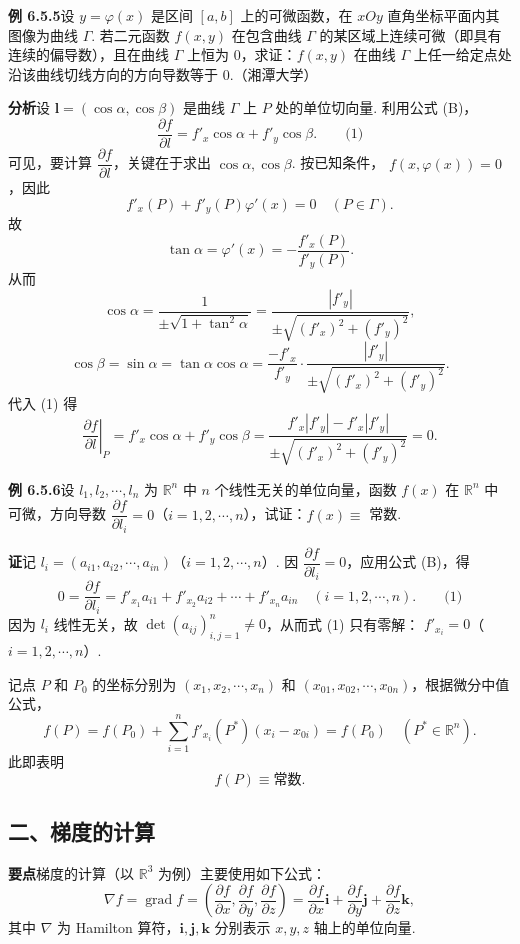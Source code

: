 \documentclass[UTF8, 12pt, fontset=fandol, oneside]{ctexart}
\begin{document}
\noindent\textbf{例 6.5.5}\quad 设 $y=\varphi(x)$ 是区间 $[a,b]$ 上的可微函数，在 $xOy$ 直角坐标平面内其图像为曲线 $\Gamma$. 若二元函数 $f(x,y)$ 在包含曲线 $\Gamma$ 的某区域上连续可微（即具有连续的偏导数），且在曲线 $\Gamma$ 上恒为 $0$，求证：$f(x,y)$ 在曲线 $\Gamma$ 上任一给定点处沿该曲线切线方向的方向导数等于 $0$.（湘潭大学）

\noindent\textbf{分析}\quad 设 $\mathbf l=(\cos\alpha,\cos\beta)$ 是曲线 $\Gamma$ 上 $P$ 处的单位切向量. 利用公式 (B)，
\[
  \frac{\partial f}{\partial l}=f'_x\cos\alpha+f'_y\cos\beta. \qquad\text{(1)}
\]
可见，要计算 $\dfrac{\partial f}{\partial l}$，关键在于求出 $\cos\alpha,\cos\beta$. 按已知条件，
$f(x,\varphi(x))=0$，因此
\[
  f'_x(P)+f'_y(P)\varphi'(x)=0\quad(P\in\Gamma).
\]
故
\[
  \tan\alpha=\varphi'(x)=-\frac{f'_x(P)}{f'_y(P)}.
\]
从而
\[
  \cos\alpha=\frac1{\pm\sqrt{1+\tan^2\alpha}}
  =
  \frac{|f'_y|}{\pm\sqrt{(f'_x)^2+(f'_y)^2}},
\]
\[
  \cos\beta=\sin\alpha=\tan\alpha\cos\alpha
  =
  \frac{-f'_x}{f'_y}\cdot
  \frac{|f'_y|}{\pm\sqrt{(f'_x)^2+(f'_y)^2}}.
\]
代入 (1) 得
\[
\left.\frac{\partial f}{\partial l}\right|_P
=f'_x\cos\alpha+f'_y\cos\beta
=
\frac{f'_x|f'_y|-f'_x|f'_y|}
{\pm\sqrt{(f'_x)^2+(f'_y)^2}}
=0.
\]

\noindent\textbf{例 6.5.6}\quad 设 $l_1,l_2,\cdots,l_n$ 为 $\mathbb R^n$ 中 $n$ 个线性无关的单位向量，函数 $f(x)$ 在 $\mathbb R^n$ 中可微，方向导数
$\dfrac{\partial f}{\partial l_i}=0$（$i=1,2,\cdots,n$），试证：$f(x)\equiv$ 常数.

\noindent\textbf{证}\quad 记 $l_i=(a_{i1},a_{i2},\cdots,a_{in})$（$i=1,2,\cdots,n$）. 因
$\dfrac{\partial f}{\partial l_i}=0$，应用公式 (B)，得
\[
  0=\frac{\partial f}{\partial l_i}
  =
  f'_{x_1}a_{i1}+f'_{x_2}a_{i2}+\cdots+f'_{x_n}a_{in}
  \quad(i=1,2,\cdots,n). \qquad\text{(1)}
\]
因为 $l_i$ 线性无关，故 $\det(a_{ij})_{i,j=1}^n\ne0$，从而式 (1) 只有零解：
$f'_{x_i}=0$（$i=1,2,\cdots,n$）.

记点 $P$ 和 $P_0$ 的坐标分别为 $(x_1,x_2,\cdots,x_n)$ 和
$(x_{01},x_{02},\cdots,x_{0n})$，根据微分中值公式，
\[
  f(P)=f(P_0)+\sum_{i=1}^n f'_{x_i}(P^*)(x_i-x_{0i})=f(P_0)
  \quad(P^*\in\mathbb R^n).
\]
此即表明
\[
  f(P)\equiv\text{常数}.
\]

\subsection*{二、梯度的计算}

\noindent\textbf{要点}\quad 梯度的计算（以 $\mathbb R^3$ 为例）主要使用如下公式：
\[
  \nabla f=\operatorname{grad}f
  =
  \left(\frac{\partial f}{\partial x},\frac{\partial f}{\partial y},\frac{\partial f}{\partial z}\right)
  =
  \frac{\partial f}{\partial x}\mathbf i
  +\frac{\partial f}{\partial y}\mathbf j
  +\frac{\partial f}{\partial z}\mathbf k,
\]
其中 $\nabla$ 为 Hamilton 算符，$\mathbf i,\mathbf j,\mathbf k$ 分别表示 $x,y,z$ 轴上的单位向量.
\end{document}
